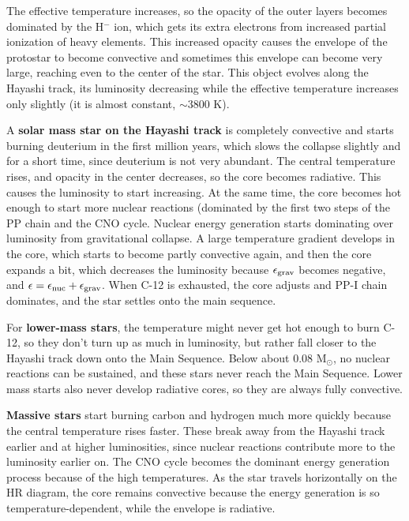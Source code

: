 The effective temperature increases, so the opacity of the outer layers becomes dominated by the H$^-$ ion, which gets its extra electrons from increased partial ionization of heavy elements. This increased opacity causes the envelope of the protostar to become convective and sometimes this envelope can become very large, reaching even to the center of the star. This object evolves along the Hayashi track, its luminosity decreasing while the effective temperature increases only slightly (it is almost constant, $\sim 3800$ K).

A \textbf{solar mass star on the Hayashi track} is completely convective and starts burning deuterium in the first million years, which slows the collapse slightly and for a short time, since deuterium is not very abundant. The central temperature rises, and opacity in the center decreases, so the core becomes radiative. This causes the luminosity to start increasing. At the same time, the core becomes hot enough to start more nuclear reactions (dominated by the first two steps of the PP chain and the CNO cycle. Nuclear energy generation starts dominating over luminosity from gravitational collapse. A large temperature gradient develops in the core, which starts to become partly convective again, and then the core expands a bit, which decreases the luminosity because $\epsilon_{\rm grav}$ becomes negative, and $\epsilon = \epsilon_{\rm nuc} + \epsilon_{\rm grav}$. When C-12 is exhausted, the core adjusts and PP-I chain dominates, and the star settles onto the main sequence.

For \textbf{lower-mass stars}, the temperature might never get hot enough to burn C-12, so they don't turn up as much in luminosity, but rather fall closer to the Hayashi track down onto the Main Sequence. Below about 0.08 M$_\odot$, no nuclear reactions can be sustained, and these stars never reach the Main Sequence. Lower mass starts also never develop radiative cores, so they are always fully convective.

\textbf{Massive stars} start burning carbon and hydrogen much more quickly because the central temperature rises faster. These break away from the Hayashi track earlier and at higher luminosities, since nuclear reactions contribute more to the luminosity earlier on. The CNO cycle becomes the dominant energy generation process because of the high temperatures. As the star travels horizontally on the HR diagram, the core remains convective because the energy generation is so temperature-dependent, while the envelope is radiative.

